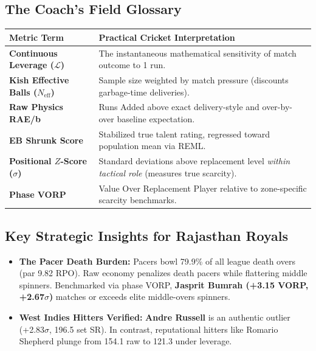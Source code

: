 \documentclass[10pt,a4paper]{article}
\begin{document}
\subsection*{The Coach's Field Glossary}
\begin{center}
\small
\begin{tabularx}{\textwidth}{l p{12.4cm}}
\toprule
\textbf{Metric Term} & \textbf{Practical Cricket Interpretation} \\
\midrule
\textbf{Continuous Leverage ($\mathcal{L}$)} & The instantaneous mathematical sensitivity of match outcome to 1 run. \\
\textbf{Kish Effective Balls ($N_{\text{eff}}$)} & Sample size weighted by match pressure (discounts garbage-time deliveries). \\
\textbf{Raw Physics RAE/b} & Runs Added above exact delivery-style and over-by-over baseline expectation. \\
\textbf{EB Shrunk Score} & Stabilized true talent rating, regressed toward population mean via REML. \\
\textbf{Positional $Z$-Score ($\sigma$)} & Standard deviations above replacement level \textit{within tactical role} (measures true scarcity). \\
\textbf{Phase VORP} & Value Over Replacement Player relative to zone-specific scarcity benchmarks. \\
\bottomrule
\end{tabularx}
\end{center}

\subsection*{Key Strategic Insights for Rajasthan Royals}
\begin{itemize}[leftmargin=1.2em]
    \item \textbf{The Pacer Death Burden:} Pacers bowl 79.9\% of all league death overs (par 9.82 RPO). Raw economy penalizes death pacers while flattering middle spinners. Benchmarked via phase VORP, \textbf{Jasprit Bumrah (+3.15 VORP, +2.67$\sigma$)} matches or exceeds elite middle-overs spinners.
    \item \textbf{West Indies Hitters Verified:} \textbf{Andre Russell} is an authentic outlier (+2.83$\sigma$, 196.5 set SR). In contrast, reputational hitters like Romario Shepherd plunge from 154.1 raw to 121.3 under leverage.
\end{itemize}

\clearpage
\end{document}
